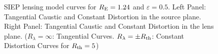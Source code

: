 \begin{figure}[!ht]
\caption{\label{siep_curves_pm-4} SIEP lensing model curves for $R_{\rm E}=1.24$
and $\varepsilon=0.5$. Left Panel: Tangential Caustic and Constant Distortion in
the source plane. Right Panel: Tangential Caustic and Constant Distortion in the
lens plane. ($R_\lambda=\infty$: Tangential Curves. $R_\lambda=\pm R_{\rm th}$:
Constant Distortion Curves for $R_{\rm th}=5$)}
\end{figure}


